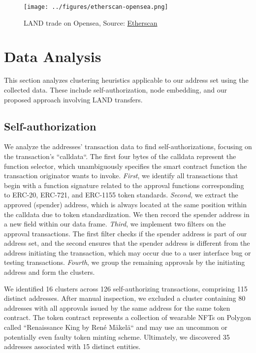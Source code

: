 \documentclass[12pt,a4paper,titlepage,oneside,english]{article}
\begin{document}
\begin{figure}[h!]
	\centering
	\texttt{[image: ../figures/etherscan-opensea.png]}
	\caption{LAND trade on Opensea, Source: \href{https://etherscan.io/tx/0x2c2a70114e9080596bf5da6ad9c9b9f6d7e4c85a9d3b06e992f7248f9457a2ec}{Etherscan}}
	\label{fig:LAND_example}
\end{figure}


\section{Data Analysis}
This section analyzes clustering heuristics applicable to our address set using the collected data. These include self-authorization, node embedding, and our proposed approach involving LAND transfers.

\subsection{Self-authorization}
We analyze the addresses' transaction data to find self-authorizations, focusing on the transaction's ``calldata``. The first four bytes of the calldata represent the function selector, which unambiguously specifies the smart contract function the transaction originator wants to invoke. \newline
\textit{First}, we identify all transactions that begin with a function signature related to the approval functions corresponding to ERC-20, ERC-721, and ERC-1155 token standards. \textit{Second}, we extract the approved (spender) address, which is always located at the same position within the calldata due to token standardization. We then record the spender address in a new field within our data frame. \textit{Third}, we implement two filters on the approval transactions. The first filter checks if the spender address is part of our address set, and the second ensures that the spender address is different from the address initiating the transaction, which may occur due to a user interface bug or testing transactions. \textit{Fourth}, we group the remaining approvals by the initiating address and form the clusters.

We identified 16 clusters across 126 self-authorizing transactions, comprising 115 distinct addresses. After manual inspection, we excluded a cluster containing 80 addresses with all approvals issued by the same address for the same token contract. The token contract represents a collection of wearable NFTs on Polygon called ``Renaissance King by René Mäkelä`` and may use an uncommon or potentially even faulty token minting scheme. Ultimately, we discovered 35 addresses associated with 15 distinct entities.
\end{document}
